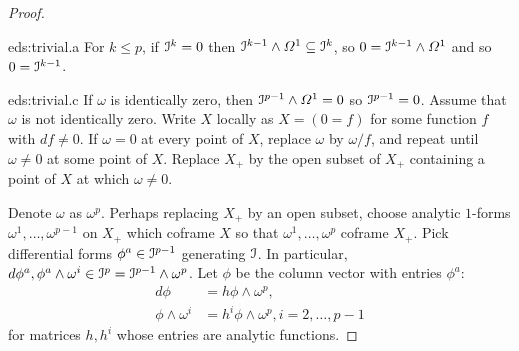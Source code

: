 \begin{proof}
\begin{answer}{eds:trivial.a}
For \(k\le p\), if \(\mathcal{I}^k=0\) then \(\mathcal{I}^{k-1}\wedge\Omega^1\subseteq \mathcal{I}^k\), so \(0=\mathcal{I}^{k-1}\wedge\Omega^1\) and so \(0=\mathcal{I}^{k-1}\).
\end{answer}
\begin{answer}{eds:trivial.c}
If \(\omega\) is identically zero, then \(\mathcal{I}^{p-1}\wedge \Omega^1=0\) so \(\mathcal{I}^{p-1}=0\).
Assume that \(\omega\) is not identically zero.
Write \(X\) locally as \(X=(0=f)\) for some function \(f\) with \(df\ne 0\).
If \(\omega=0\) at every point of \(X\), replace \(\omega\) by \(\omega/f\), and repeat until \(\omega\ne 0\) at some point of \(X\).
Replace \(X_+\) by the open subset of \(X_+\) containing a point of \(X\) at which \(\omega\ne 0\).
\end{answer}
Denote \(\omega\) as \(\omega^p\).
Perhaps replacing \(X_+\) by an open subset, choose analytic \(1\)-forms \(\omega^1,\dots,\omega^{p-1}\) on \(X_+\) which coframe \(X\) so that \(\omega^1,\dots,\omega^p\) coframe \(X_+\).
Pick differential forms \(\phi^a\in\mathcal{I}^{p-1}\) generating \(\mathcal{I}\).
In particular, \(d\phi^a,\phi^a\wedge\omega^i\in\mathcal{I}^p=\mathcal{I}^{p-1}\wedge\omega^p\).
Let \(\phi\) be the column vector with entries \(\phi^a\):
\begin{align*}
d\phi &= h \phi\wedge\omega^p,\\
\phi\wedge\omega^i&=h^i \phi\wedge\omega^p, i=2,\dots,p-1
\end{align*}
for matrices \(h,h^i\) whose entries are analytic functions.


\end{proof}
